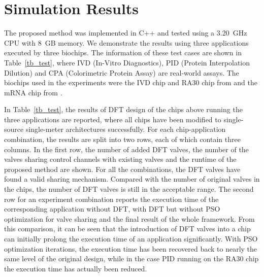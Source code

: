 \section{Simulation Results}\label{sec:results}

The proposed method was implemented in C++ and tested
using a \SI[mode=text]{3.20}{\GHz} CPU with 
\SI{8}{GB} memory.  We demonstrate the results using 
three applications executed by three biochips.
The information of these test cases are shown in 
Table~\ref{tb_test}, where IVD (In-Vitro Diagnostics),
PID (Protein Interpolation Dilution) and 
CPA (Colorimetric Protein Assay)
are real-world assays. The biochips used in the experiments were
the IVD chip and RA30 chip from \cite{Liu2017} and 
the mRNA chip from \cite{MAQuake06}. 

In Table~\ref{tb_test}, the results of DFT design of the chips above running
the three applications are reported, where all chips have been modified 
to single-source single-meter architectures successfully.
For each chip-application combination, the results are
split into two rows, each of which contain three columns. In the first row,
the number of added DFT valves, the number of the valves sharing control
channels with existing valves and the runtime of the proposed method are
shown. For all the combinations, the DFT valves have found a valid sharing
mechanism. Compared with the number of original valves in the chips, the
number of DFT valves is still in the acceptable range. The second row for 
an experiment combination reports the execution time of the corresponding
application without DFT, with DFT but without PSO optimization for valve 
sharing and the final result of the whole framework. From this comparison,
it can be seen that the introduction of DFT valves into a chip can initially
prolong the execution time of an application significantly. With 
PSO optimization iterations, the execution time has been recovered back to
nearly the same level of the original design, while in the case PID running on
the RA30 chip the execution time has actually been reduced.



